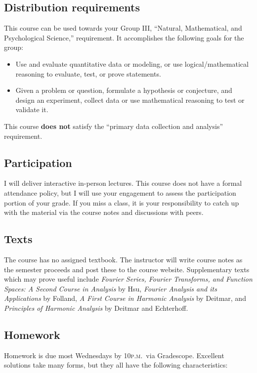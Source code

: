 \documentclass[11pt,twoside]{amsart}
\begin{document}
\subsection*{Distribution requirements}
This course can be used towards your Group III, ``Natural, Mathematical, and Psychological Science,'' requirement.  It accomplishes the following goals for the group:
\begin{itemize}
\item Use and evaluate quantitative data or modeling, or use logical/mathematical reasoning to evaluate, test, or prove statements.
\item Given a problem or question, formulate a hypothesis or conjecture, and design an experiment, collect data or use mathematical reasoning to test or validate it.
\end{itemize}
This course \textbf{does not} satisfy the ``primary data collection and analysis'' requirement.

\subsection*{Participation}
I will deliver interactive in-person lectures. This course does not have a formal attendance policy, but I will use your engagement to assess the participation portion of your grade. If you miss a class, it is your responsibility to catch up with the material via the course notes and discussions with peers.

\subsection*{Texts}
The course has no assigned textbook.  The instructor will write course notes as the semester proceeds and post these to the course website.  Supplementary texts which may prove useful include \emph{Fourier Series, Fourier Transforms, and Function Spaces: A Second Course in Analysis} by Hsu, \emph{Fourier Analysis and its Applications} by Folland, \emph{A First Course in Harmonic Analysis} by Deitmar, and \emph{Principles of Harmonic Analysis} by Deitmar and Echterhoff.

\subsection*{Homework}
Homework is due most Wednesdays by 10\textsc{p.m.}~via Gradescope. Excellent solutions take many forms, but they all have the following characteristics:
\end{document}
